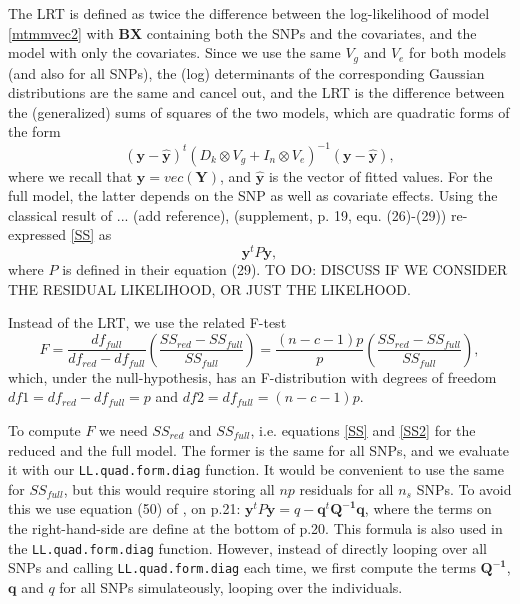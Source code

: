\documentclass[12pt]{article}
\begin{document}
The LRT is defined as twice the difference between the log-likelihood of model \eqref{mtmmvec2} with $\mathbf{B} \mathbf{X}$ containing both the SNPs and the covariates, and the model with only the covariates. Since we use the same $V_g$ and $V_e$ for both models (and also for all SNPs), the (log) determinants of the corresponding Gaussian distributions are the same and cancel out, and the LRT is the difference between the (generalized) sums of squares of the two models, which are quadratic forms of the form
%
\begin{equation} \label{SS}
(\mathbf{y} - \mathbf{\hat  y})^t \left(D_k \otimes V_g  + I_n \otimes V_e\right)^{-1} (\mathbf{y} - \mathbf{\hat  y}),
\end{equation}
%  
where we recall that $\mathbf{y} = vec(\mathbf{Y})$, and $\mathbf{\hat  y}$ is the vector of fitted values. 
For the full model, the latter depends on the SNP as well as covariate effects. Using the classical result of ... (add reference), \cite{zhou_stephens_2014} (supplement, p. 19, equ. (26)-(29)) re-expressed \eqref{SS} as
\begin{equation} \label{SS2}
\mathbf{y}^t P \mathbf{y},
\end{equation}
where $P$ is defined in their equation (29). TO DO: DISCUSS IF WE CONSIDER THE RESIDUAL LIKELIHOOD, OR JUST THE LIKELHOOD. 


Instead of the LRT, we use the related F-test
%
\begin{equation} \label{Ftest}
F = \frac{df_{full}}{df_{red} - df_{full}} \left(\frac{SS_{red} - SS_{full}}{SS_{full}}\right) = \frac{(n-c-1)p}{p} \left(\frac{SS_{red} - SS_{full}}{SS_{full}}\right),
\end{equation}
%
which, under the null-hypothesis, has an F-distribution with degrees of freedom $df1 = df_{red} - df_{full} = p$ and $df2 = df_{full} = (n-c-1)p$.

To compute $F$ we need $SS_{red}$ and $SS_{full}$, i.e. equations \eqref{SS} and \eqref{SS2} for the reduced and the full model. The former is the same for all SNPs, and we evaluate it with our \verb|LL.quad.form.diag| function. It would be convenient to use the same for $SS_{full}$, but this would require storing all $np$ residuals for all $n_s$ SNPs. To avoid this we use equation (50) of \cite{zhou_stephens_2014}, on p.21: $\mathbf{y}^t P \mathbf{y} = q - \mathbf{q}^t \mathbf{Q^{-1}} \mathbf{q}$, where the terms on the right-hand-side are define at the bottom of p.20. This formula is also used in the \verb|LL.quad.form.diag| function. However, instead of directly looping over all SNPs and calling \verb|LL.quad.form.diag| each time, we first compute the terms $\mathbf{Q^{-1}}$,  $\mathbf{q}$ and $q$ for all SNPs simulateously, looping over the individuals.   
\end{document}
